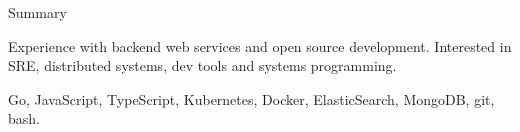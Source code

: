 \documentclass{resume} %
\begin{document}

\begin{rSection}{Summary}
  \begin{rSummarySection}
  {
    \item Experience with backend web services and open source development. Interested in SRE, distributed systems, dev tools and systems programming.
    \item Go, JavaScript, TypeScript, Kubernetes, Docker, ElasticSearch, MongoDB, git, bash.
  }
  \end{rSummarySection}
\end{rSection}

\end{document}
